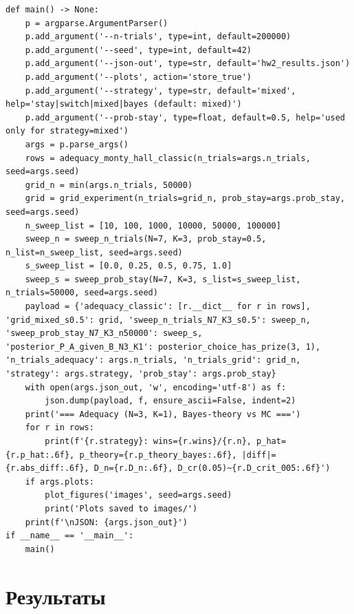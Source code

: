 \documentclass[a4paper, 14pt]{extarticle}
\begin{document}
\begin{longlisting}
\begin{verbatim}
def main() -> None:
    p = argparse.ArgumentParser()
    p.add_argument('--n-trials', type=int, default=200000)
    p.add_argument('--seed', type=int, default=42)
    p.add_argument('--json-out', type=str, default='hw2_results.json')
    p.add_argument('--plots', action='store_true')
    p.add_argument('--strategy', type=str, default='mixed', help='stay|switch|mixed|bayes (default: mixed)')
    p.add_argument('--prob-stay', type=float, default=0.5, help='used only for strategy=mixed')
    args = p.parse_args()
    rows = adequacy_monty_hall_classic(n_trials=args.n_trials, seed=args.seed)
    grid_n = min(args.n_trials, 50000)
    grid = grid_experiment(n_trials=grid_n, prob_stay=args.prob_stay, seed=args.seed)
    n_sweep_list = [10, 100, 1000, 10000, 50000, 100000]
    sweep_n = sweep_n_trials(N=7, K=3, prob_stay=0.5, n_list=n_sweep_list, seed=args.seed)
    s_sweep_list = [0.0, 0.25, 0.5, 0.75, 1.0]
    sweep_s = sweep_prob_stay(N=7, K=3, s_list=s_sweep_list, n_trials=50000, seed=args.seed)
    payload = {'adequacy_classic': [r.__dict__ for r in rows], 'grid_mixed_s0.5': grid, 'sweep_n_trials_N7_K3_s0.5': sweep_n, 'sweep_prob_stay_N7_K3_n50000': sweep_s, 'posterior_P_A_given_B_N3_K1': posterior_choice_has_prize(3, 1), 'n_trials_adequacy': args.n_trials, 'n_trials_grid': grid_n, 'strategy': args.strategy, 'prob_stay': args.prob_stay}
    with open(args.json_out, 'w', encoding='utf-8') as f:
        json.dump(payload, f, ensure_ascii=False, indent=2)
    print('=== Adequacy (N=3, K=1), Bayes-theory vs MC ===')
    for r in rows:
        print(f'{r.strategy}: wins={r.wins}/{r.n}, p_hat={r.p_hat:.6f}, p_theory={r.p_theory_bayes:.6f}, |diff|={r.abs_diff:.6f}, D_n={r.D_n:.6f}, D_cr(0.05)~{r.D_crit_005:.6f}')
    if args.plots:
        plot_figures('images', seed=args.seed)
        print('Plots saved to images/')
    print(f'\nJSON: {args.json_out}')
if __name__ == '__main__':
    main()
\end{verbatim}
\end{longlisting}

\section{Результаты}
\end{document}
